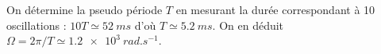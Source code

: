 
\begin{corrige}
On détermine la pseudo période $T$ en mesurant la durée correspondant à 10 oscillations : $10T \simeq \SI{52}{ms}$ d'où $T\simeq\SI{5.2}{ms}$. On en déduit $\Omega = 2\pi/T \simeq \SI{1.2e3}{rad.s^{-1}}$.
\end{corrige}



\finEntrainement






\afficheReponsesMelangees

\finFicheEntrainement                                                                        %


\ifdefined\mainIsLoaded\else
\printReponsesEtCorriges
\fi
